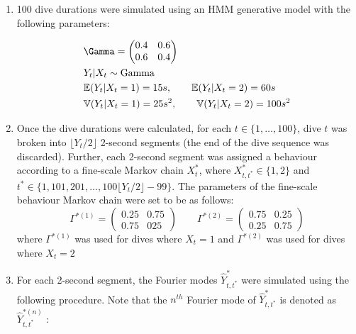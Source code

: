 \begin{enumerate}
	\item 100 dive durations were simulated using an HMM generative model with the following parameters:
	
	\begin{align*}
		&\Gamma = \begin{pmatrix} 0.4 & 0.6 \\ 0.6 & 0.4 \end{pmatrix} \\
		&Y_t|X_t \sim {\rm{Gamma}} \\
		&\bbE(Y_t|X_t = 1) = 15 s, \quad \quad \bbE(Y_t|X_t = 2) = 60 s \\
		&\bbV(Y_t|X_t = 1) = 25 s^2, \quad \quad  \bbV(Y_t|X_t = 2) = 100 s^2
	\end{align*}
	
	\item Once the dive durations were calculated, for each $t \in \{1, \ldots, 100\}$, dive $t$ was broken into $\lfloor Y_t/2 \rfloor$ 2-second segments (the end of the dive sequence was discarded). Further, each 2-second segment was assigned a behaviour according to a fine-scale Markov chain $X^*_t$, where $X^*_{t,t^*} \in \{1,2\}$ and $t^* \in \{1,101,201,\ldots,100\lfloor Y_t/2 \rfloor - 99\}$. The parameters of the fine-scale behaviour Markov chain were set to be as follows:
	$$\Gamma^{*(1)} = \begin{pmatrix} 0.25 & 0.75 \\ 0.75 & 025 \end{pmatrix} \qquad 	\Gamma^{*(2)} = \begin{pmatrix} 0.75 & 0.25 \\ 0.25 & 0.75 \end{pmatrix}$$
	where $\Gamma^{*(1)}$ was used for dives where $X_t = 1$ and $\Gamma^{*(2)}$ was used for dives where $X_t = 2$
	
	\item For each 2-second segment, the Fourier modes $\hat{Y}^*_{t,t^*}$ were simulated using the following procedure. Note that the $n^{th}$ Fourier mode of $\hat{Y}^*_{t,t^*}$ is denoted as $\hat{Y}^{*(n)}_{t,t^*}$ :
	

\end{enumerate}
